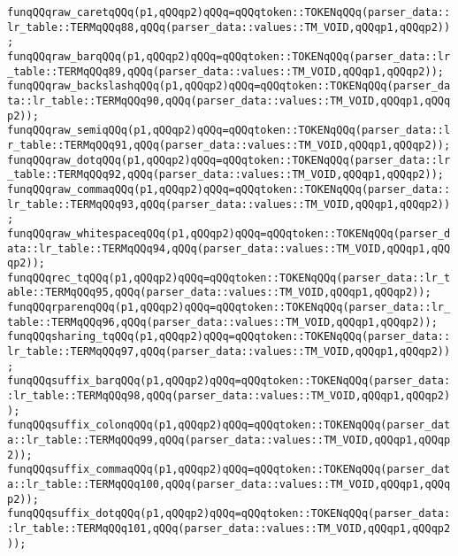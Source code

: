 \verb|funqQQqraw_caretqQQq(p1,qQQqp2)qQQq=qQQqtoken::TOKENqQQq(parser_data::lr_table::TERMqQQq88,qQQq(parser_data::values::TM_VOID,qQQqp1,qQQqp2));|\newline
\verb|funqQQqraw_barqQQq(p1,qQQqp2)qQQq=qQQqtoken::TOKENqQQq(parser_data::lr_table::TERMqQQq89,qQQq(parser_data::values::TM_VOID,qQQqp1,qQQqp2));|\newline
\verb|funqQQqraw_backslashqQQq(p1,qQQqp2)qQQq=qQQqtoken::TOKENqQQq(parser_data::lr_table::TERMqQQq90,qQQq(parser_data::values::TM_VOID,qQQqp1,qQQqp2));|\newline
\verb|funqQQqraw_semiqQQq(p1,qQQqp2)qQQq=qQQqtoken::TOKENqQQq(parser_data::lr_table::TERMqQQq91,qQQq(parser_data::values::TM_VOID,qQQqp1,qQQqp2));|\newline
\verb|funqQQqraw_dotqQQq(p1,qQQqp2)qQQq=qQQqtoken::TOKENqQQq(parser_data::lr_table::TERMqQQq92,qQQq(parser_data::values::TM_VOID,qQQqp1,qQQqp2));|\newline
\verb|funqQQqraw_commaqQQq(p1,qQQqp2)qQQq=qQQqtoken::TOKENqQQq(parser_data::lr_table::TERMqQQq93,qQQq(parser_data::values::TM_VOID,qQQqp1,qQQqp2));|\newline
\verb|funqQQqraw_whitespaceqQQq(p1,qQQqp2)qQQq=qQQqtoken::TOKENqQQq(parser_data::lr_table::TERMqQQq94,qQQq(parser_data::values::TM_VOID,qQQqp1,qQQqp2));|\newline
\verb|funqQQqrec_tqQQq(p1,qQQqp2)qQQq=qQQqtoken::TOKENqQQq(parser_data::lr_table::TERMqQQq95,qQQq(parser_data::values::TM_VOID,qQQqp1,qQQqp2));|\newline
\verb|funqQQqrparenqQQq(p1,qQQqp2)qQQq=qQQqtoken::TOKENqQQq(parser_data::lr_table::TERMqQQq96,qQQq(parser_data::values::TM_VOID,qQQqp1,qQQqp2));|\newline
\verb|funqQQqsharing_tqQQq(p1,qQQqp2)qQQq=qQQqtoken::TOKENqQQq(parser_data::lr_table::TERMqQQq97,qQQq(parser_data::values::TM_VOID,qQQqp1,qQQqp2));|\newline
\verb|funqQQqsuffix_barqQQq(p1,qQQqp2)qQQq=qQQqtoken::TOKENqQQq(parser_data::lr_table::TERMqQQq98,qQQq(parser_data::values::TM_VOID,qQQqp1,qQQqp2));|\newline
\verb|funqQQqsuffix_colonqQQq(p1,qQQqp2)qQQq=qQQqtoken::TOKENqQQq(parser_data::lr_table::TERMqQQq99,qQQq(parser_data::values::TM_VOID,qQQqp1,qQQqp2));|\newline
\verb|funqQQqsuffix_commaqQQq(p1,qQQqp2)qQQq=qQQqtoken::TOKENqQQq(parser_data::lr_table::TERMqQQq100,qQQq(parser_data::values::TM_VOID,qQQqp1,qQQqp2));|\newline
\verb|funqQQqsuffix_dotqQQq(p1,qQQqp2)qQQq=qQQqtoken::TOKENqQQq(parser_data::lr_table::TERMqQQq101,qQQq(parser_data::values::TM_VOID,qQQqp1,qQQqp2));|\newline
